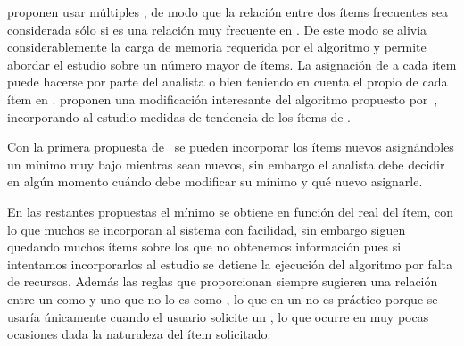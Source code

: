 















\citet{LiuHsuMa-ARMWithMultipleMS-1999} proponen usar múltiples \soportes, de modo que la relación entre dos ítems frecuentes sea considerada sólo si es una relación muy frecuente en \D. De este modo se alivia considerablemente la carga de memoria requerida por el algoritmo y permite abordar el estudio sobre un número mayor de ítems. La asignación de \soporte a cada ítem puede hacerse por parte del analista o bien teniendo en cuenta el propio \soporte de cada ítem en \D. \citet{KiranReddy-ImprovedMultipleMSBasedAppMineRareAR-2009} proponen una modificación interesante del algoritmo propuesto por~\citeauthor{LiuHsuMa-ARMWithMultipleMS-1999}, incorporando al estudio medidas de tendencia de los ítems de \D.

Con la primera propuesta de~\citeauthor{LiuHsuMa-ARMWithMultipleMS-1999} se pueden incorporar los ítems nuevos asignándoles un \soporte mínimo muy bajo mientras sean nuevos, sin embargo el analista debe decidir en algún momento cuándo debe modificar su \soporte mínimo y qué nuevo \soporte asignarle.

En las restantes propuestas el \soporte mínimo se obtiene en función del \soporte real del ítem, con lo que muchos \irs se incorporan al sistema con facilidad, sin embargo siguen quedando muchos ítems sobre los que no obtenemos información pues si intentamos incorporarlos al estudio se detiene la ejecución del algoritmo por falta de recursos. Además las reglas que proporcionan siempre sugieren una relación entre un \ir como \antecedente y uno que no lo es como \consecuente, lo que en un \sr no es práctico porque se usaría únicamente cuando el usuario solicite un \ir, lo que ocurre en muy pocas ocasiones dada la naturaleza del ítem solicitado.















